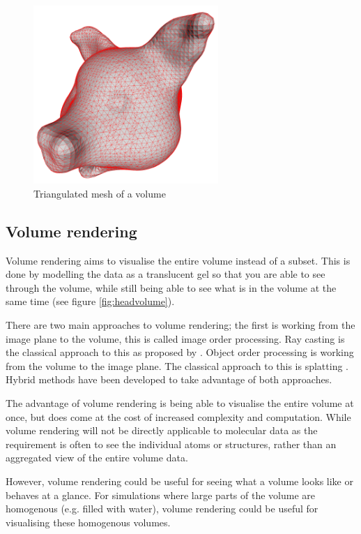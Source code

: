 \begin{figure}[h!]
  \begin{center}
    \includegraphics[width=70mm]{triangulated_mesh}
  \end{center}
  \caption{Triangulated mesh of a volume}
  \label{fig:triangulatedmesh}
\end{figure}


\subsection{Volume rendering}
\label{sub:volumerendering}

Volume rendering aims to visualise the entire volume instead of a subset. This
is done by modelling the data as a translucent gel so that you are able to see
through the volume, while still being able to see what is in the volume at the
same time (see figure \ref{fig:headvolume}).

There are two main approaches to volume rendering; the first is working from the
image plane to the volume, this is called image order processing. Ray casting is
the classical approach to this as proposed by \citet{levoy88}. Object order
processing is working from the volume to the image plane. The classical approach
to this is splatting \citep{westover89}. Hybrid methods have been developed to
take advantage of both approaches.

The advantage of volume rendering is being able to visualise the entire volume
at once, but does come at the cost of increased complexity and computation.
While volume rendering will not be directly applicable to molecular data as the
requirement is often to see the individual atoms or structures, rather than an
aggregated view of the entire volume data.

However, volume rendering could be useful for seeing what a volume looks like
or behaves at a glance. For simulations where large parts of the volume are
homogenous (e.g. filled with water), volume rendering could be useful for
visualising these homogenous volumes.


